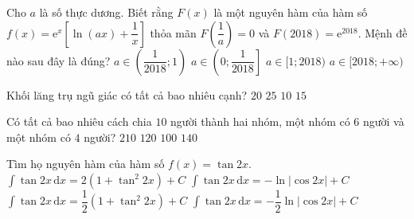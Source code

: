 \begin{ex}%
Cho $a$ là số thực dương. Biết rằng $F(x)$ là một nguyên hàm của hàm số $f(x)=\mathrm{e}^x\left[ \ln (ax) +\dfrac{1}{x} \right]$ thỏa mãn $F\left( \dfrac{1}{a} \right)=0$ và $F(2018)=\mathrm{e}^{2018}$. Mệnh đề nào sau đây là đúng?
\choice
{\True $a\in \left( \dfrac{1}{2018};1 \right)$}
{$a\in \left( 0;\dfrac{1}{2018} \right]$}
{$a\in [1;2018)$}
{$a\in [2018;+\infty)$}
\end{ex}

\begin{ex}%
Khối lăng trụ ngũ giác có tất cả bao nhiêu cạnh?
\choice
{$20$}
{$25$}
{$10$}
{\True $15$}
\end{ex}

\begin{ex}%
Có tất cả bao nhiêu cách chia $10$ người thành hai nhóm, một nhóm có $6$ người và một nhóm có $4$ người?
\choice
{\True $210$}
{$120$}
{$100$}
{$140$}
\end{ex}

\begin{ex}%
Tìm họ nguyên hàm của hàm số $f(x)=\tan 2x$.
\choice
{$\displaystyle\int\tan 2x \mathrm{\,d}x=2\left( 1+\tan^2 2x \right)+C$}
{$\displaystyle\int\tan 2x \mathrm{\,d}x=-\ln \left| \cos 2x \right|+C$}
{$\displaystyle\int\tan 2x \mathrm{\,d}x=\dfrac{1}{2}\left( 1+\tan^2 2x \right)+C$}
{\True $\displaystyle\int\tan 2x \mathrm{\,d}x=-\dfrac{1}{2}\ln \left| \cos 2x \right|+C$}
\end{ex}


